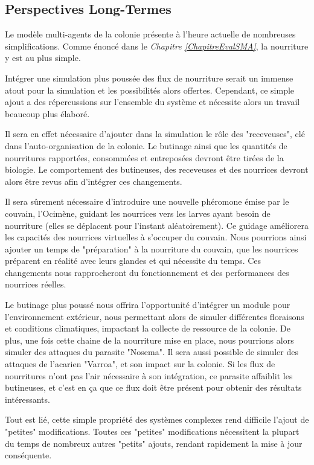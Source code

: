 	\subsection*{Perspectives Long-Termes}
	Le modèle multi-agents de la colonie présente à l'heure actuelle de nombreuses simplifications. Comme énoncé dans le \textit{Chapitre \ref{ChapitreEvalSMA}}, la nourriture y est au plus simple. 
	
	Intégrer une simulation plus poussée des flux de nourriture serait un immense atout pour la simulation et les possibilités alors offertes. Cependant, ce simple ajout a des répercussions sur l'ensemble du système et nécessite alors un travail beaucoup plus élaboré. 
	
	Il sera en effet nécessaire d'ajouter dans la simulation le rôle des "receveuses", clé dans l'auto-organisation de la colonie. Le butinage ainsi que les quantités de nourritures rapportées, consommées et entreposées devront être tirées de la biologie. Le comportement des butineuses, des receveuses et des nourrices devront alors être revus afin d'intégrer ces changements.
	
	Il sera sûrement nécessaire d'introduire une nouvelle phéromone émise par le couvain, l'Ocimène, guidant les nourrices vers les larves ayant besoin de nourriture (elles se déplacent pour l'instant aléatoirement). Ce guidage améliorera les capacités des nourrices virtuelles à s'occuper du couvain. Nous pourrions ainsi ajouter un temps de "préparation" à la nourriture du couvain, que les nourrices préparent en réalité avec leurs glandes et qui nécessite du temps. Ces changements nous rapprocheront du fonctionnement et des performances des nourrices réelles.
	
	Le butinage plus poussé nous offrira l'opportunité d'intégrer un module pour l'environnement extérieur, nous permettant alors de simuler différentes floraisons et conditions climatiques, impactant la collecte de ressource de la colonie. De plus, une fois cette chaine de la nourriture mise en place, nous pourrions alors simuler des attaques du parasite "Nosema". Il sera aussi possible de simuler des attaques de l'acarien "Varroa", et son impact sur la colonie. Si les flux de nourritures n'ont pas l'air nécessaire à son intégration, ce parasite affaiblit les butineuses, et c'est en ça que ce flux doit être présent pour obtenir des résultats intéressants.
	
	Tout est lié, cette simple propriété des systèmes complexes rend difficile l'ajout de "petites" modifications. Toutes ces "petites" modifications nécessitent la plupart du temps de nombreux autres "petits" ajouts, rendant rapidement la mise à jour conséquente.
	